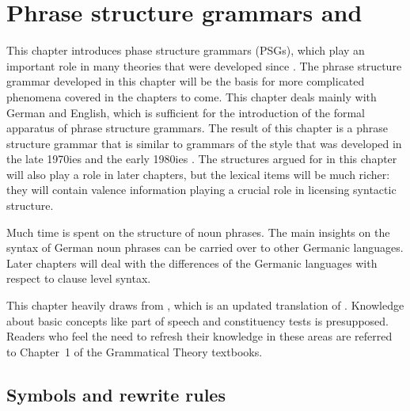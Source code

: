 \chapter{Phrase structure grammars and \xbart}
\label{chap-psg-xbar}\label{chap-psg}


This chapter introduces phase structure grammars (PSGs), which play an important role in many
theories that were developed since . The phrase structure grammar developed in
this chapter will be the basis for more complicated phenomena covered in the chapters to come. This
chapter deals mainly with German and English, which is sufficient for the introduction of the formal apparatus
of phrase structure grammars. The result of this chapter is a phrase structure grammar that is
similar to \xbar grammars of the style that was developed in the late 1970ies and the early 1980ies
\citep{Jackendoff77a}. The structures argued for in this chapter will also play a role in later
chapters, but the lexical items will be much richer: they will contain valence information playing a
crucial role in licensing syntactic structure.

Much time is spent on the structure of noun phrases. The main insights on the syntax of German noun
phrases can be carried over to other Germanic languages. Later chapters will deal with the
differences of the Germanic languages with respect to clause level syntax.

This chapter heavily draws from , which is an updated translation of
. Knowledge about basic concepts like part of speech and
constituency tests is presupposed. Readers who feel the need to refresh their knowledge in these
areas are referred to Chapter~1 of the Grammatical Theory textbooks.

\section{Symbols and rewrite rules}
\label{sec-simple-psg}

